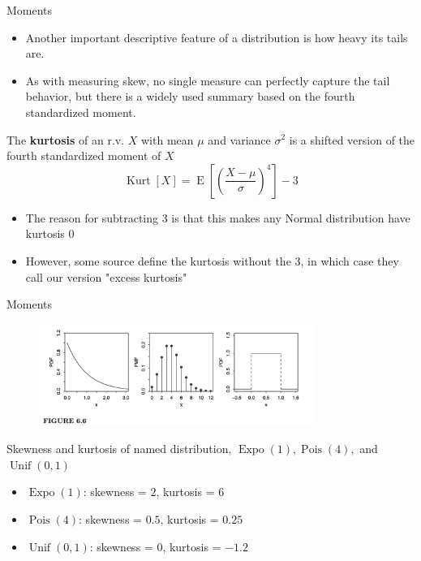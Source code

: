 \documentclass[8pt]{beamer}
\newcommand{\tb}[1]{\textbf{#1}}
\newcommand{\mypois}[1]{\operatorname{Pois}(#1)}
\newcommand{\myunif}[2]{\operatorname{Unif}\!\left(#1, #2\right)}
\newcommand{\myexpo}[1]{\operatorname{Expo}\!\left(#1\right)}
\newcommand{\expec}[1]{\operatorname{E}\left[ #1 \right]}
\newcommand{\mykurt}[1]{\operatorname{Kurt}\!\left[#1\right]}
\begin{document}
\begin{frame}{Moments}
    \begin{itemize}
        \item Another important descriptive feature of a distribution is how heavy its tails are.
        \item As with measuring skew, no single measure can perfectly capture the tail behavior, but there is a widely used summary based on the fourth standardized moment.
    \end{itemize}
    \begin{definition}[Kurtosis]
        The \tb{kurtosis} of an r.v. $X$ with mean $\mu$ and variance $\sigma^2$ is a shifted version of the fourth standardized moment of $X$
        \[
        \mykurt{X} = \expec{\left(\frac{X-\mu}{\sigma}\right)^4} - 3
        \]
    \end{definition}
    \begin{itemize}
        \item The reason for subtracting $3$ is that this makes any Normal distribution have kurtosis $0$
        \item However, some source define the kurtosis without the $3$, in which case they call our version "excess kurtosis"    
    \end{itemize}
\end{frame}

\begin{frame}{Moments}
    \begin{figure}
        \centering
        \includegraphics[width=0.8\textwidth]{SkewAndKurtosis.png}
    \end{figure}

    Skewness and kurtosis of named distribution, $\myexpo{1}, \mypois{4},$ and $\myunif{0}{1}$
    \begin{itemize}
        \item $\myexpo{1}$: skewness = $2$, kurtosis = $6$
        \item $\mypois{4}$: skewness = $0.5$, kurtosis = $0.25$
        \item $\myunif{0}{1}$: skewness = $0$, kurtosis = $-1.2$
    \end{itemize}
\end{frame}
\end{document}
